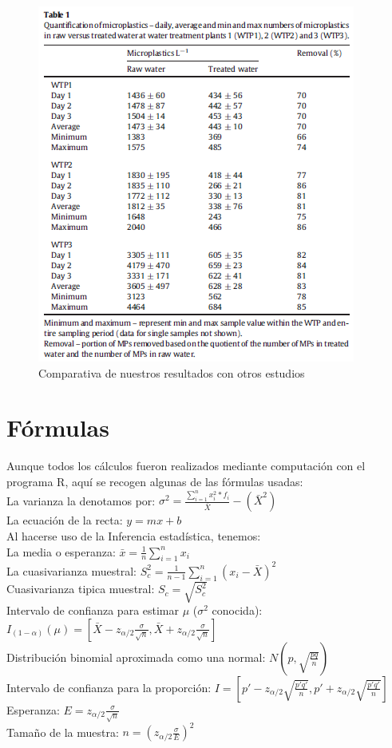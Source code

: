\documentclass[a4paper,11pt]{article}
\begin{document}
	\begin{figure}[h]
	\centering
	\includegraphics[scale=0.5]{tabla3.png}
	\caption{Comparativa de nuestros resultados con otros estudios}
	\label{tabla3}
	
	\end{figure}

\section{Fórmulas}
	Aunque todos los cálculos fueron realizados mediante computación con el programa R, aquí se recogen algunas de las fórmulas usadas:\\
	La varianza la denotamos por: $\sigma^2=\frac{\sum_{i=1}^{n}x_{i}^2*f_{i}}{\bar{X}}-(\bar{X}^2)$\\
	La ecuación de la recta: $y=mx+b$\\
	Al hacerse uso de la Inferencia estadística, tenemos:\\
	La media o esperanza: $\bar{x}=\frac{1}{n}\sum_{i=1}^{n}x_{i}$\\
	La cuasivarianza muestral:
	$S_{c}^{2}=\frac{1}{n-1}\sum_{i=1}^{n}(x_{i}-\bar{X})^{2}$\\
	Cuasivarianza tipica muestral:
	$S_{c}=\sqrt{S_{c}^{2}}$\\
	Intervalo de confianza para estimar $\mu$ ($\sigma^{2}$ conocida):
	$I_{(1-\alpha)}(\mu)=[\bar{X}-z_{\alpha/2}\frac{\sigma}{\sqrt{n}},\bar{X}+z_{\alpha/2}\frac{\sigma}{\sqrt{n}}]$\\
	Distribución binomial aproximada como una normal:
	$N(p,\sqrt{\frac{pq}{n}})$\\
	Intervalo de confianza para la proporción:
	$I=[p'-z_{\alpha/2}\sqrt{\frac{p'q'}{n}},p'+z_{\alpha/2}\sqrt{\frac{p'q'}{n}}]$\\
	Esperanza: $E=z_{\alpha/2}\frac{\sigma}{\sqrt{n}}$\\
	Tamaño de la muestra: $n=(z_{\alpha/2}\frac{\sigma}{E})^{2}$
	
	
	
\end{document}
